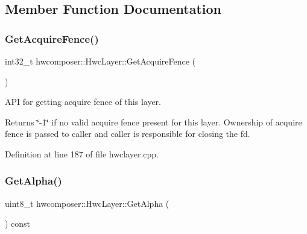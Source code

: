 \subsection{Member Function Documentation}
\mbox{\label{structhwcomposer_1_1HwcLayer_add109f8c8a6e9051c10a34ad9535a822}} 
\subsubsection{\texorpdfstring{Get\+Acquire\+Fence()}{GetAcquireFence()}}
{\footnotesize\ttfamily int32\+\_\+t hwcomposer\+::\+Hwc\+Layer\+::\+Get\+Acquire\+Fence (\begin{DoxyParamCaption}{ }\end{DoxyParamCaption})}

A\+PI for getting acquire fence of this layer. \begin{DoxyReturn}{Returns}
\char`\"{}-\/1\char`\"{} if no valid acquire fence present for this layer. Ownership of acquire fence is passed to caller and caller is responsible for closing the fd. 
\end{DoxyReturn}


Definition at line 187 of file hwclayer.\+cpp.


\begin{DoxyCode}{0}
\end{DoxyCode}
\mbox{\label{structhwcomposer_1_1HwcLayer_a3108c9e303ad88d33782dd44d228e50e}} 
\subsubsection{\texorpdfstring{Get\+Alpha()}{GetAlpha()}}
{\footnotesize\ttfamily uint8\+\_\+t hwcomposer\+::\+Hwc\+Layer\+::\+Get\+Alpha (\begin{DoxyParamCaption}{ }\end{DoxyParamCaption}) const\hspace{0.3cm}{\ttfamily [inline]}}



